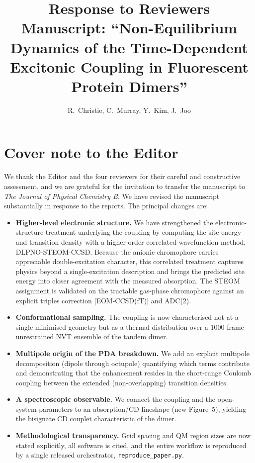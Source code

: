 \documentclass[11pt]{article}
\title{\vspace{-2.5em}Response to Reviewers\\[2pt]
\large Manuscript: ``Non-Equilibrium Dynamics of the Time-Dependent Excitonic Coupling in Fluorescent Protein Dimers''}
\author{R.\ Christie, C.\ Murray, Y.\ Kim, J.\ Joo}
\date{}
\begin{document}
\maketitle
\vspace{-2.5em}

\section*{Cover note to the Editor}

We thank the Editor and the four reviewers for their careful and constructive
assessment, and we are grateful for the invitation to transfer the manuscript to
\emph{The Journal of Physical Chemistry B}. We have revised the manuscript
substantially in response to the reports. The principal changes are:

\begin{itemize}[leftmargin=1.4em, itemsep=2pt]
  \item \textbf{Higher-level electronic structure.} We have strengthened the
  electronic-structure treatment underlying the coupling by computing the site energy
  and transition density with a higher-order correlated wavefunction method,
  DLPNO-STEOM-CCSD. Because the anionic chromophore carries appreciable
  double-excitation character, this correlated treatment captures physics beyond a
  single-excitation description and brings the predicted site energy into closer
  agreement with the measured absorption. The STEOM assignment is validated on the
  tractable gas-phase chromophore against an explicit triples correction
  [EOM-CCSD(fT)] and ADC(2).
  \item \textbf{Conformational sampling.} The coupling is now characterised not at a
  single minimised geometry but as a thermal distribution over a
  1000-frame unrestrained NVT ensemble of the tandem dimer.
  \item \textbf{Multipole origin of the PDA breakdown.} We add an explicit
  multipole decomposition (dipole through octupole) quantifying which terms contribute
  and demonstrating that the enhancement resides in the short-range Coulomb coupling
  between the extended (non-overlapping) transition densities.
  \item \textbf{A spectroscopic observable.} We connect the coupling and the
  open-system parameters to an absorption/CD lineshape (new Figure~5), yielding the bisignate CD
  couplet characteristic of the dimer.
  \item \textbf{Methodological transparency.} Grid spacing and QM region sizes are now
  stated explicitly, all software is cited, and the entire workflow is reproduced by a
  single released orchestrator, \texttt{reproduce\_paper.py}.
\end{itemize}
\end{document}
